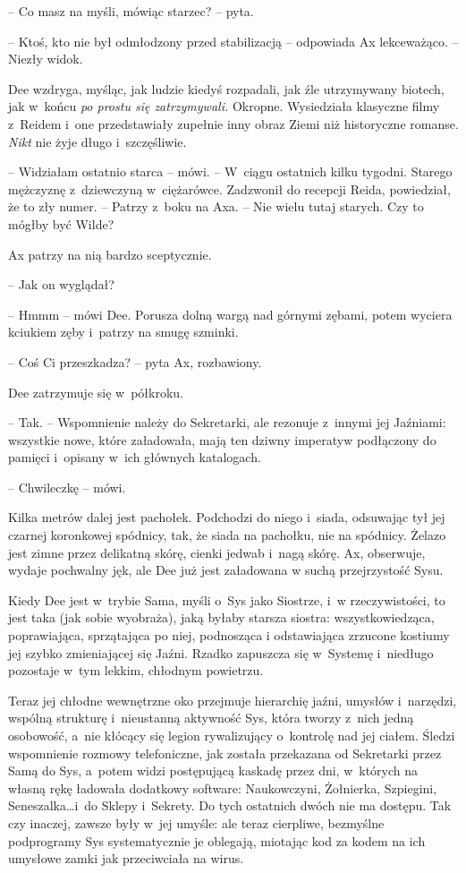 \documentclass[oneside,polish,11pt,sfheadings]{mwbk}
\begin{document}
-- Co masz na myśli, mówiąc starzec? -- pyta.

-- Ktoś, kto nie był odmłodzony przed stabilizacją -- odpowiada Ax
lekceważąco. -- Niezły widok.

Dee wzdryga, myśląc, jak ludzie kiedyś rozpadali, jak źle utrzymywany
biotech, jak w~końcu \emph{po prostu się zatrzymywali.} Okropne.
Wysiedziała klasyczne filmy z~Reidem i~one przedstawiały zupełnie inny
obraz Ziemi niż historyczne romanse. \emph{Nikt} nie żyje długo i~szczęśliwie.

-- Widziałam ostatnio starca -- mówi. -- W~ciągu ostatnich kilku tygodni.
Starego mężczyznę z~dziewczyną w~ciężarówce. Zadzwonił do recepcji
Reida, powiedział, że to zły numer. -- Patrzy z~boku na Axa. -- Nie wielu
tutaj starych. Czy to mógłby być Wilde?

Ax patrzy na nią bardzo sceptycznie. 

-- Jak on wyglądał?

-- Hmmm -- mówi Dee. Porusza dolną wargą nad górnymi zębami, potem wyciera
kciukiem zęby i~patrzy na smugę szminki.

-- Coś Ci przeszkadza? -- pyta Ax, rozbawiony.

Dee zatrzymuje się w~półkroku. 

-- Tak. -- Wspomnienie należy do
Sekretarki, ale rezonuje z~innymi jej Jaźniami: wszystkie nowe, które
załadowała, mają ten dziwny imperatyw podłączony do pamięci i~opisany w~ich głównych katalogach.

-- Chwileczkę -- mówi.

Kilka metrów dalej jest pachołek. Podchodzi do niego i~siada, odsuwając
tył jej czarnej koronkowej spódnicy, tak, że siada na pachołku, nie na
spódnicy. Żelazo jest zimne przez delikatną skórę, cienki jedwab i~nagą
skórę. Ax, obserwuje, wydaje pochwalny jęk, ale Dee już jest załadowana
w suchą przejrzystość Sysu.

Kiedy Dee jest w~trybie Sama, myśli o~Sys jako Siostrze, i~w rzeczywistości, to jest taka (jak sobie wyobraża), jaką byłaby starsza
siostra: wszystkowiedząca, poprawiająca, sprzątająca po niej, podnosząca
i odstawiająca zrzucone kostiumy jej szybko zmieniającej się Jaźni.
Rzadko zapuszcza się w~Systemę i~niedługo pozostaje w~tym lekkim,
chłodnym powietrzu.

Teraz jej chłodne wewnętrzne oko przejmuje hierarchię jaźni, umysłów i~narzędzi, wspólną strukturę i~nieustanną aktywność Sys, która tworzy z~nich jedną osobowość, a~nie kłócący się legion rywalizujący o~kontrolę
nad jej ciałem. Śledzi wspomnienie rozmowy telefoniczne, jak została
przekazana od Sekretarki przez Samą do Sys, a~potem widzi postępującą
kaskadę przez dni, w~których na własną rękę ładowała dodatkowy software:
Naukowczyni, Żołnierka, Szpiegini, Seneszalka\ldots i~do Sklepy i~Sekrety.
Do tych ostatnich dwóch nie ma dostępu. Tak czy inaczej, zawsze były w~jej umyśle: ale teraz cierpliwe, bezmyślne podprogramy Sys
systematycznie je oblegają, miotając kod za kodem na ich umysłowe zamki
jak przeciwciała na wirus.
\end{document}
